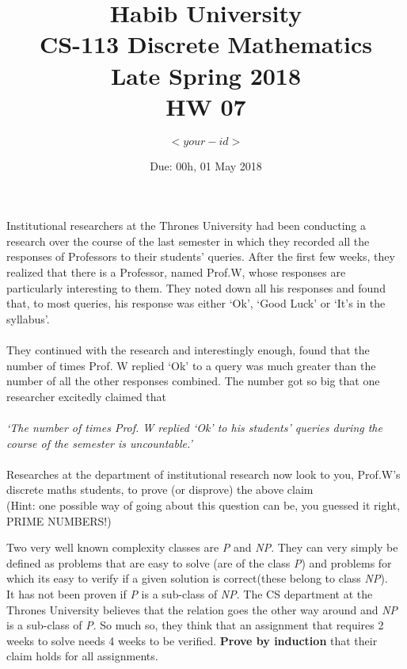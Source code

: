 \documentclass[addpoints]{exam}
\title{Habib University\\CS-113 Discrete Mathematics\\Late Spring 2018\\HW 07}
\author{$<your-id>$}
\date{Due: 00h, 01 May 2018}
\begin{document}
	\maketitle
	\begin{questions}
		
		
		
		\question
		Institutional researchers at the Thrones University had been conducting a research over the course of the last semester in which they recorded all the responses of Professors to their students' queries. After the first few weeks, they realized that there is a Professor, named Prof.W, whose responses are particularly interesting to them. They noted down all his responses and found that, to most queries, his response was either `Ok', `Good Luck' or `It's in the syllabus'. \\ \\
		They continued with the research and interestingly enough, found that the number of times Prof. W replied `Ok' to a query was much greater than the number of all the other responses combined. The number got so big that one researcher excitedly claimed that \\ \\ \textit{`The number of times Prof. W replied `Ok' to his students' queries during the course of the semester is uncountable.'} \\ \\
		Researches at the department of institutional research now look to you, Prof.W's discrete maths students, to prove (or disprove) the above claim \\
		(Hint: one possible way of going about this question can be, you guessed it right, PRIME NUMBERS!)
		\begin{solution}
		\end{solution}
		
		
		\question  
		Two very well known complexity classes are \textit{P} and \textit{NP}. They can very simply be defined as problems that are easy to solve (are of the class \textit{P}) and problems for which its easy to verify if a given solution is correct(these belong to class \textit{NP}).\\
		It has not been proven if \textit{P} is a sub-class of \textit{NP}. The CS department at the Thrones University believes that the relation goes the other way around and \textit{NP} is a sub-class of \textit{P}. So much so, they think that an assignment that requires 2 weeks to solve needs 4 weeks to be verified. \textbf{Prove by induction} that their claim holds for all assignments. \\
		

\end{questions}
\end{document}
